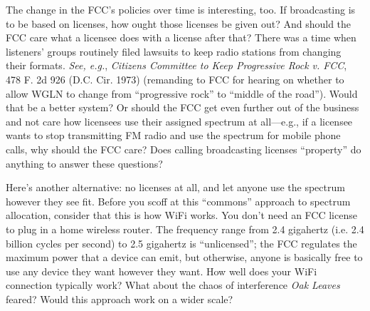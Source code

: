 The change in the FCC's policies over time is interesting, too. If broadcasting
is to be based on licenses, how ought those licenses be given out? And should
the FCC care what a licensee does with a license after that? There was a time
when listeners' groups routinely filed lawsuits to keep radio stations from
changing their formats. \textit{See, e.g.}, \textit{Citizens Committee to Keep
Progressive Rock v. FCC}, 478 F. 2d 926 (D.C. Cir. 1973) (remanding to FCC for
hearing on whether to allow WGLN to change from ``progressive rock'' to
``middle of the road''). Would that be a better system? Or should the FCC get
even further out of the business and not care how licensees use their assigned
spectrum at all---e.g., if a licensee wants to stop transmitting FM radio and
use the spectrum for mobile phone calls, why should the FCC care? Does calling
broadcasting licenses ``property'' do anything to answer these questions?

Here's another alternative: no licenses at all, and let anyone use the spectrum
however they see fit. Before you scoff at this ``commons'' approach to spectrum
allocation, consider that this is how WiFi works. You don't need an FCC license
to plug in a home wireless router. The frequency range from 2.4 gigahertz (i.e.
2.4 billion cycles per second) to 2.5 gigahertz is ``unlicensed''; the FCC
regulates the maximum power that a device can emit, but otherwise, anyone is
basically free to use any device they want however they want. How well does
your WiFi connection typically work? What about the chaos of interference
\textit{Oak Leaves} feared? Would this approach work on a wider scale?


